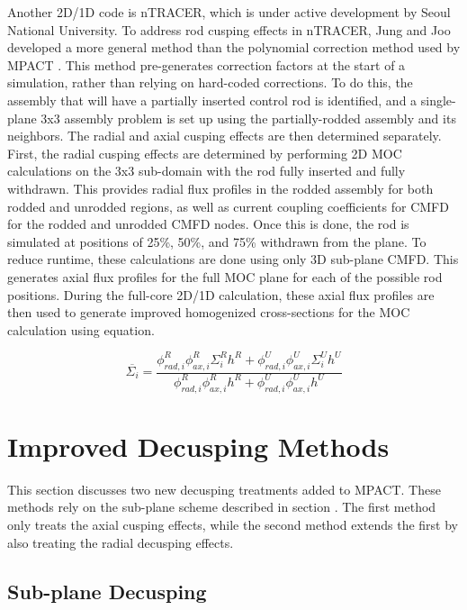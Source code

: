 Another 2D/1D code is nTRACER, which is under active development by Seoul National University.  To address rod cusping effects in nTRACER, Jung and Joo developed a more general method than the polynomial correction method used by MPACT \cite{ICAPPcontrolRodDecuspingNTRACER}.  This method pre-generates correction factors at the start of a simulation, rather than relying on hard-coded corrections.  To do this, the assembly that will have a partially inserted control rod is identified, and a single-plane 3x3 assembly problem is set up using the partially-rodded assembly and its neighbors.  The radial and axial cusping effects are then determined separately.  First, the radial cusping effects are determined by performing 2D MOC calculations on the 3x3 sub-domain with the rod fully inserted and fully withdrawn.  This provides radial flux profiles in the rodded assembly for both rodded and unrodded regions, as well as current coupling coefficients for CMFD for the rodded and unrodded CMFD nodes.  Once this is done, the rod is simulated at positions of 25\%, 50\%, and 75\% withdrawn from the plane.  To reduce runtime, these calculations are done using only 3D sub-plane CMFD.  This generates axial flux profiles for the full MOC plane for each of the possible rod positions.  During the full-core 2D/1D calculation, these axial flux profiles are then used to generate improved homogenized cross-sections for the MOC calculation using equation.

\begin{equation}\label{e:nTRACERdecusping}
\overline{\Sigma_i} = \frac{\phi_{rad,i}^R \phi_{ax,i}^R \Sigma_i^R h^R + \phi_{rad,i}^U \phi_{ax,i}^U \Sigma_i^U h^U}{\phi_{rad,i}^R \phi_{ax,i}^R h^R + \phi_{rad,i}^U \phi_{ax,i}^U h^U}
\end{equation}


\section{Improved Decusping Methods}

This section discusses two new decusping treatments added to MPACT.  These methods rely on the sub-plane scheme described in section .  The first method only treats the axial cusping effects, while the second method extends the first by also treating the radial decusping effects.

\subsection{Sub-plane Decusping}

